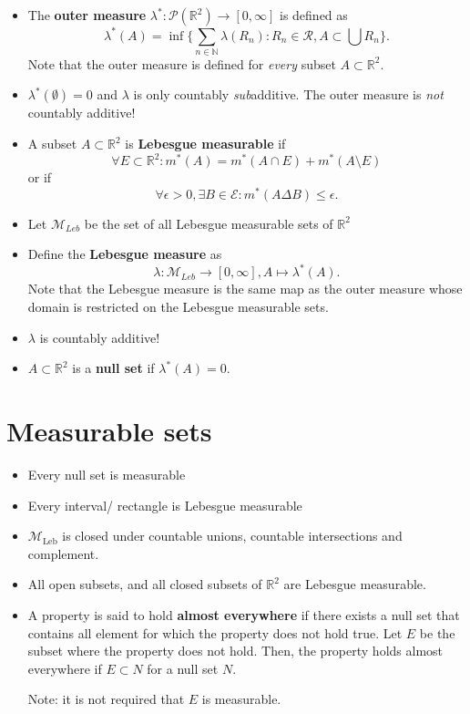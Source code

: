 \documentclass[a4paper, 11pt]{article}
\theoremstyle{plain}
\theoremstyle{definition}
\begin{document}
\begin{itemize}
	\item The \textbf{outer measure} $\lambda^*: \mathcal P(\mathbb R^2) \to [0,\infty]$ is defined as 
	\[
		\lambda^*(A) = \inf\{ \sum_{n\in \mathbb N} \lambda(R_n) : R_n \in \mathcal R, A \subset \bigcup R_n \}.
	\]
	Note that the outer measure is defined for \emph{every} subset $A \subset \mathbb R^2$.
	
	\item $\lambda^*(\emptyset) = 0$ and $\lambda$ is only countably \emph{sub}additive. The outer measure is \emph{not} countably additive! 
	
	\item A subset $A \subset \mathbb R^2$ is \textbf{Lebesgue measurable} if
	\[
		\forall E \subset \mathbb R^2: m^*(A) = m^*(A \cap E) + m^*(A \setminus E)
	\]
	or if 
	\[
		\forall \epsilon>0, \exists B \in \mathcal E: m^*(A \Delta B) \leq \epsilon.
	\]
	\item Let $\mathcal M_{Leb}$ be the set of all Lebesgue measurable sets of $\mathbb R^2$
	\item Define the \textbf{Lebesgue measure} as 
	\[
		\lambda: \mathcal M_{Leb} \to [0,\infty], A \mapsto \lambda^*(A).
	\]
	Note that the Lebesgue measure is the same map as the outer measure whose domain is restricted on the Lebesgue measurable sets.
	
	\item $\lambda$ is countably additive!
	\item $A \subset \mathbb R^2$ is a \textbf{null set} if $\lambda^*(A) = 0$.
\end{itemize}

\section{Measurable sets}
\begin{itemize}
	\item Every null set is measurable
	\item Every interval/ rectangle is Lebesgue measurable
	\item $\mathcal M_{\mathrm{Leb}}$ is closed under countable unions, countable intersections and complement.
	\item All open subsets, and all closed subsets of $\mathbb R^2$ are Lebesgue measurable.
	\item A property is said to hold \textbf{almost everywhere} if there exists a null set that contains all element for which the property does not hold true. Let $E$ be the subset where the property does not hold. Then, the property holds almost everywhere if $E \subset N$ for a null set $N$.
	
	Note: it is not required that $E$ is measurable.
\end{itemize}
\end{document}

